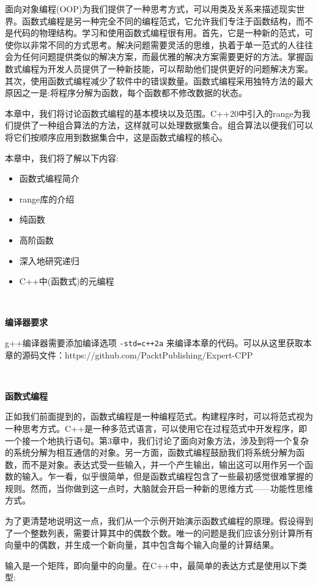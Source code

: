面向对象编程(OOP)为我们提供了一种思考方式，可以用类及关系来描述现实世界。函数式编程是另一种完全不同的编程范式，它允许我们专注于函数结构，而不是代码的物理结构。学习和使用函数式编程很有用。首先，它是一种新的范式，可使你以非常不同的方式思考。解决问题需要灵活的思维，执着于单一范式的人往往会为任何问题提供类似的解决方案，而最优雅的解决方案需要更好的方法。掌握函数式编程为开发人员提供了一种新技能，可以帮助他们提供更好的问题解决方案。其次，使用函数式编程减少了软件中的错误数量。函数式编程采用独特方法的最大原因之一是:将程序分解为函数，每个函数都不修改数据的状态。\par
本章中，我们将讨论函数式编程的基本模块以及范围。C++20中引入的range为我们提供了一种组合算法的方法，这样就可以处理数据集合。组合算法以便我们可以将它们按顺序应用到数据集合中，这是函数式编程的核心。 \par
本章中，我们将了解以下内容: \par

\begin{itemize}
	\item 函数式编程简介
	\item range库的介绍
	\item 纯函数
	\item 高阶函数
	\item 深入地研究递归
	\item C++中(函数式)的元编程
\end{itemize}

\noindent\textbf{}\ \par
\textbf{编译器要求} \ \par
g++编译器需要添加编译选项 \texttt{-std=c++2a} 来编译本章的代码。可以从这里获取本章的源码文件：https:/​/github.​com/PacktPublishing/Expert-CPP \par

\noindent\textbf{}\ \par
\textbf{函数式编程} \ \par
正如我们前面提到的，函数式编程是一种编程范式。构建程序时，可以将范式视为一种思考方式。C++是一种多范式语言，可以使用它在过程范式中开发程序，即一个接一个地执行语句。第3章中，我们讨论了面向对象方法，涉及到将一个复杂的系统分解为相互通信的对象。另一方面，函数式编程鼓励我们将系统分解为函数，而不是对象。表达式受一些输入，并一个产生输出，输出这可以用作另一个函数的输入。乍一看，似乎很简单，但是函数式编程包含了一些最初感觉很难掌握的规则。然而，当你做到这一点时，大脑就会开启一种新的思维方式——功能性思维方式。 \par 
为了更清楚地说明这一点，我们从一个示例开始演示函数式编程的原理。假设得到了一个整数列表，需要计算其中的偶数个数。唯一的问题是我们应该分别计算所有向量中的偶数，并生成一个新向量，其中包含每个输入向量的计算结果。 \par
输入是一个矩阵，即向量中的向量。在C++中，最简单的表达方式是使用以下类型: \par

